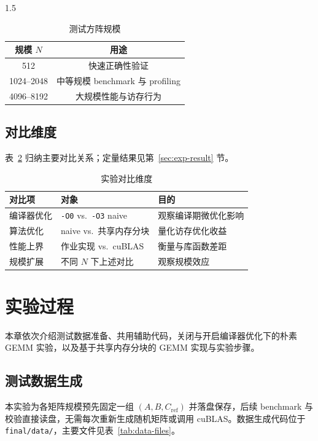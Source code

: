\documentclass[zihao=-4]{ctexart}
\begin{document}
\begin{spacing}{1.5}
\begin{table}[H]
\small
\centering
\caption{测试方阵规模}
\label{tab:matmul-sizes}
\begin{tabular}{cc}
\toprule
规模 $N$ & 用途 \\
\midrule
512  & 快速正确性验证 \\
1024--2048 & 中等规模 benchmark 与 profiling \\
4096--8192 & 大规模性能与访存行为 \\
\bottomrule
\end{tabular}
\end{table}

\subsection{对比维度}

表~\ref{tab:exp-compare} 归纳主要对比关系；定量结果见第~\ref{sec:exp-result} 节。

\begin{table}[H]
\small
\centering
\caption{实验对比维度}
\label{tab:exp-compare}
\begin{tabular}{lll}
\toprule
对比项 & 对象 & 目的 \\
\midrule
编译器优化 & \protect\texttt{-O0} vs.\ \protect\texttt{-O3} naive & 观察编译期微优化影响 \\
算法优化 & naive vs.\ 共享内存分块 & 量化访存优化收益 \\
性能上界 & 作业实现 vs.\ cuBLAS & 衡量与库函数差距 \\
规模扩展 & 不同 $N$ 下上述对比 & 观察规模效应 \\
\bottomrule
\end{tabular}
\end{table}


\section{实验过程}
\label{sec:exp-proc}

本章依次介绍测试数据准备、共用辅助代码，关闭与开启编译器优化下的朴素 GEMM 实验，以及基于共享内存分块的 GEMM 实现与实验步骤。

\subsection{测试数据生成}

本实验为各矩阵规模预先固定一组 $(A,B,C_{\mathrm{ref}})$ 并落盘保存，后续 benchmark 与校验直接读盘，无需每次重新生成随机矩阵或调用 cuBLAS。数据生成代码位于 \protect\texttt{final/data/}，主要文件见表~\ref{tab:data-files}。


\end{spacing}
\end{document}
